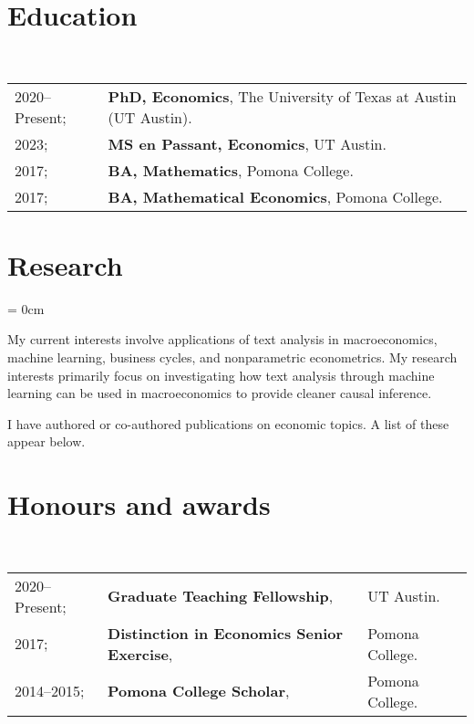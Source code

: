 \documentclass[a4paper, 10pt]{article}
\begin{document}
  \maketitle
  \thispagestyle{firststyle}
  \section{Education}
  ~\begin{tabular}{ll}
    2020--Present; & \textbf{PhD, Economics}, The University of Texas at Austin (UT Austin).\\
    2023; & \textbf{MS en Passant, Economics}, UT Austin.\\
    2017; & \textbf{BA, Mathematics}, Pomona College.\\
    2017; & \textbf{BA, Mathematical Economics}, Pomona College.\\
  \end{tabular}
  \vspace*{0.25em}

  \section{Research}
  \begin{compactitem}\parskip = 0cm
    \item My current interests involve applications of text analysis in macroeconomics, machine learning, business cycles, and nonparametric econometrics. My research interests primarily focus on investigating how text analysis through machine learning can be used in macroeconomics to provide cleaner causal inference.
    \item I have authored or co-authored  publications on economic topics. A list of these appear below.
  \end{compactitem}
  \vspace*{0.25em}

  \vspace*{-0.75em}
  \begin{publications}
  \end{publications}
  \vspace*{-0.75em}

  \section{Honours and awards}
  ~\begin{tabular}{lll}
    2020--Present; & \textbf{Graduate Teaching Fellowship}, & UT Austin.\\
    2017; & \textbf{Distinction in Economics Senior Exercise}, & Pomona College.\\
    2014--2015; & \textbf{Pomona College Scholar}, & Pomona College.
  \end{tabular}
  \vspace*{0.25em}
\end{document}
